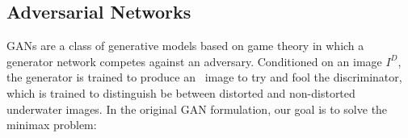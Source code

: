 \documentclass[letterpaper, 10pt, conference]{ieeeconf}
\begin{document}
\subsection{Adversarial Networks}
GANs \cite{goodfellow2014generative} are a class of generative models based on game theory in which a generator
network competes against an adversary. Conditioned on an image $I^D$, the generator is trained to produce an \
image to try and fool the discriminator, which is trained to distinguish be between distorted and non-distorted
underwater images. In the original GAN formulation, our goal is to solve the minimax problem:

\begin{figure}
\centering
\begin{tabular}{p{1.7cm} p{1.7cm} p{1.7cm} p{1.7cm}}
   

\end{tabular}
\end{figure}
\end{document}
